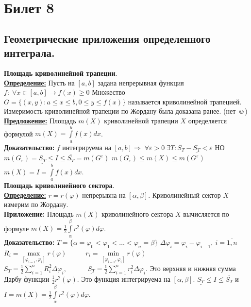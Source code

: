 \documentclass[a4paper,12pt]{article} %
\renewcommand {\geq}{\geqslant}
\renewcommand {\leq}{\leqslant}
\begin{document}
\section{Билет 8}
\subsection{Геометрические приложения определенного интеграла.}
\noindent \textbf{Площадь криволинейной трапеции}.\\
\underline{\textbf{Определение:}}
Пусть на $[a, b]$ задана непрерывная функция $f:\; \forall x \in[a, b] \rightarrow f(x) \geq 0$
Множество $G=\{(x,y): a\leq x \leq b, 0 \leq y \leq f(x)\}$ называется криволинейной трапецией.
Измеримость криволинейной трапеции по Жордану была доказана ранее. (нет $\smiley$) \\
\underline{\textbf{Предложение:}}
Площадь $m(X)$ криволинейной трапеции $X$ определяется формулой $m(X) = \int\limits_a^b f(x)dx$.\\
\textbf{Доказательство:} 
$f$ интегрируема на $[a, b] \Rightarrow \; \forall \varepsilon > 0 \; \exists T: \overline{S_T} - \underline{S_T} < \varepsilon$
НО $m(G_{\varepsilon}) = \underline{S_T} \leq I \leq \overline{S_T} = m(G^{\varepsilon}) $
$m(G_{\varepsilon}) \leq m(X) \leq m(G^{\varepsilon})$
$m(X) = I = \int\limits_a^b f(x)dx$.\\
\noindent \textbf{Площадь криволинейного сектора}.\\
\underline{\textbf{Определение:}}
$r=r(\varphi)$ непрерывна на $[\alpha, \beta]$. Криволинейный сектор $X$ измерим по Жордану.\\
\textbf{Приложение:}
Площадь $m(X)$ криволинейного сектора $X$ вычисляется по формуле $m(X) =  \frac{1}{2} \int\limits_{\alpha}^{\beta} r^2(\varphi)d\varphi$.\\
\textbf{Доказательство:}
$T = \{\alpha = \varphi_0 < \varphi_1 <\dots < \varphi_n = \beta\}$
$\Delta \varphi_i = \varphi_i - \varphi_{i-1}, ~i = \overline{1, n}$
$R_i = \max \limits_{[\varphi_{i-1}, \varphi_{i}]} r(\varphi)\; \;\;\;\;\;\;\;\;\; r_i=\min \limits_{[\varphi_{i-1}, \varphi_{i}]} r(\varphi)\;$
$\overline{S_T} = \frac{1}{2}\sum\limits_{i=1}^n R_i^2 \Delta \varphi_i,\;\;\;\;\;\;\;\;\;\;\; \underline{S_T} =\frac{1}{2}\sum\limits_{i=1}^n r_i^2 \Delta \varphi_i$.
Это верхняя и нижняя сумма Дарбу функции $\frac{1}{2}r^2(\varphi)$.
Это функция интегрируема на $[\alpha, \beta]$.
$\underline{S_T} \leq I \leq \overline{S_T}$ и $I = m(X) = \frac{1}{2}\int\limits_{\alpha}^{\beta}r^2(\varphi)d\varphi$.\\
\end{document}
